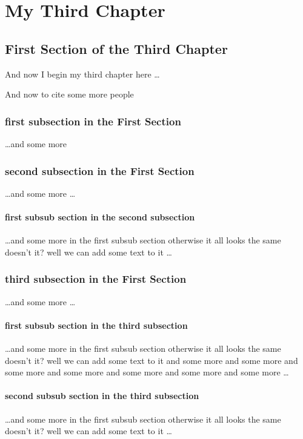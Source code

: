 \chapter{My Third Chapter}

\section{First Section of the Third Chapter}
And now I begin my third chapter here \dots

And now to cite some more people~\cite{Rea85,Spi65}

\subsection{first subsection in the First Section}
\dots and some more 

\subsection{second subsection in the First Section}
\dots and some more \dots

\subsubsection{first subsub section in the second subsection}
\dots and some more in the first subsub section otherwise it all looks the same
doesn't it? well we can add some text to it \dots

\subsection{third subsection in the First Section}
\dots and some more \dots

\subsubsection{first subsub section in the third subsection}
\dots and some more in the first subsub section otherwise it all looks the same
doesn't it? well we can add some text to it and some more and some more and
some more and some more and some more and some more and some more \dots

\subsubsection{second subsub section in the third subsection}
\dots and some more in the first subsub section otherwise it all looks the same
doesn't it? well we can add some text to it \dots


